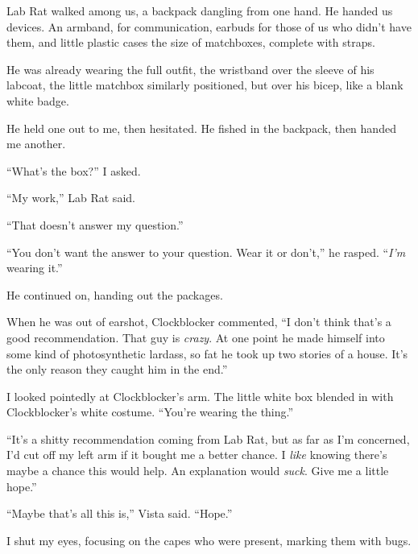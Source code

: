 Lab Rat walked among us, a backpack dangling from one hand.  He handed us devices.  An armband, for communication, earbuds for those of us who didn't have them, and little plastic cases the size of matchboxes, complete with straps.



He was already wearing the full outfit, the wristband over the sleeve of his labcoat, the little matchbox similarly positioned, but over his bicep, like a blank white badge.



He held one out to me, then hesitated.  He fished in the backpack, then handed me another.



``What's the box?'' I asked.



``My work,'' Lab Rat said.



``That doesn't answer my question.''



``You don't want the answer to your question.  Wear it or don't,'' he rasped.  ``\emph{I'm} wearing it.''



He continued on, handing out the packages.



When he was out of earshot, Clockblocker commented, ``I don't think that's a good recommendation.  That guy is \emph{crazy}.  At one point he made himself into some kind of photosynthetic lardass, so fat he took up two stories of a house.  It's the only reason they caught him in the end.''



I looked pointedly at Clockblocker's arm.  The little white box blended in with Clockblocker's white costume.  ``You're wearing the thing.''



``It's a shitty recommendation coming from Lab Rat, but as far as I'm concerned, I'd cut off my left arm if it bought me a better chance.  I \emph{like} knowing there's maybe a chance this would help.  An explanation would \emph{suck}.  Give me a little hope.''



``Maybe that's all this is,'' Vista said.  ``Hope.''



I shut my eyes, focusing on the capes who were present, marking them with bugs.



